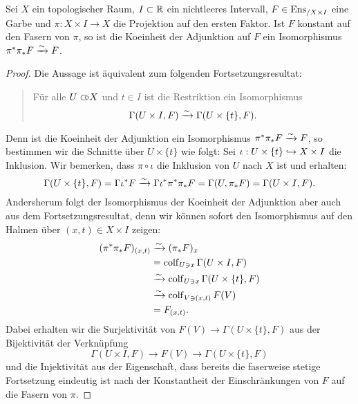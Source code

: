 \begin{lemma}[\cite{TG}, 6.4.17]
  Sei $X$ ein topologischer Raum, $I \subset \mathbb{R}$ ein nichtleeres
  Intervall, $F \in \operatorname{Ens}_{/X \times I}$ eine Garbe und $\pi: X \times
  I \to X$ die Projektion auf den ersten Faktor. Ist $F$ konstant auf
  den Fasern von $\pi$, so ist die Koeinheit der Adjunktion auf $F$
  ein Isomorphismus $\pi^* \pi_* F \xrightarrow[]{\sim} F$.
\end{lemma}
\begin{proof}
  Die Aussage ist äquivalent zum folgenden Fortsetzungsresultat:
  \begin{quote}
    Für alle $U \subset\kern-0.58em\circ X$ und $t \in I$ ist die Restriktion ein
    Isomorphismus
    \[ \Gamma(U \times I, F) \xrightarrow[]{\sim} \Gamma(U \times \{t\}, F). \]
  \end{quote}
  Denn ist die Koeinheit der Adjunktion ein Isomorphismus $\pi^* \pi_*
  F \xrightarrow[]{\sim} F$, so bestimmen wir die Schnitte über $U \times \{t\}$ wie
  folgt: Sei $\iota: U \times \{t\} \hookrightarrow X \times I$ die Inklusion. Wir
  bemerken, dass $\pi \circ \iota$ die Inklusion von $U$ nach $X$ ist
  und erhalten:
  \[ \Gamma(U \times \{t\}, F)
      = \Gamma \iota^* F
      \xrightarrow[]{\sim} \Gamma \iota^* \pi^* \pi_* F
      = \Gamma(U, \pi_* F)
      = \Gamma(U \times I, F). \]
  Andersherum folgt der Isomorphismus der Koeinheit der Adjunktion
  aber auch aus dem Fortsetzungsresultat, denn wir können sofort den
  Isomorphismus auf den Halmen über $(x, t) \in X \times I$ zeigen:
  \begin{align*}
    (\pi^* \pi_* F)_{(x,t)}
    &\xrightarrow[]{\sim} (\pi_* F)_x \\
    &= \operatorname{colf}\limits_{U \ni x} \Gamma(U \times I, F) \\
    &\xrightarrow[]{\sim} \operatorname{colf}\limits_{U \ni x} \Gamma(U \times \{t\}, F) \\
    &\xrightarrow[]{\sim} \operatorname{colf}\limits_{V \ni (x, t)} F(V) \\
    &= F_{(x, t)}.
  \end{align*}
  Dabei erhalten wir die Surjektivität von $F(V) \to \Gamma(U \times
  \{t\}, F)$ aus der Bijektivität der Verknüpfung
  \[ \Gamma(U \times I, F) \to F(V) \to \Gamma(U \times \{t\}, F) \]
  und die Injektivität aus der Eigenschaft, dass bereits die faserweise
  stetige Fortsetzung eindeutig ist nach der Konstantheit der
  Einschränkungen von $F$ auf die Fasern von $\pi$.


\end{proof}
